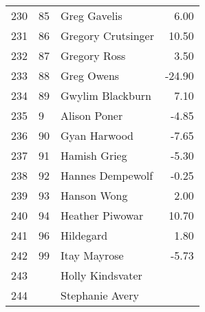 \begin{table}[ht]
\begin{tabular}{rllr}
  230 & 85 & Greg Gavelis & 6.00 \\ 
  231 & 86 & Gregory Crutsinger & 10.50 \\ 
  232 & 87 & Gregory Ross & 3.50 \\ 
  233 & 88 & Greg Owens & -24.90 \\ 
  234 & 89 & Gwylim Blackburn & 7.10 \\ 
  235 & 9 & Alison Poner & -4.85 \\ 
  236 & 90 & Gyan Harwood & -7.65 \\ 
  237 & 91 & Hamish Grieg & -5.30 \\ 
  238 & 92 & Hannes Dempewolf & -0.25 \\ 
  239 & 93 & Hanson Wong & 2.00 \\ 
  240 & 94 & Heather Piwowar & 10.70 \\ 
  241 & 96 & Hildegard & 1.80 \\ 
  242 & 99 & Itay Mayrose & -5.73 \\ 
  243 &  & Holly Kindsvater &  \\ 
  244 &  & Stephanie Avery &  \\ 
   \hline
\end{tabular}
\end{table}

